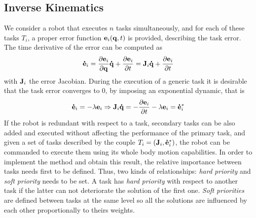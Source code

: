 \subsection{Inverse Kinematics}
We consider a robot that executes $n$ tasks simultaneously, and for each of these tasks $T_i$, a proper error function $\mathbf{e}_i(\mathbf{q},t)$ is provided, describing the task error.
The time derivative of the error can be computed as
\begin{equation}
\mathbf{\dot{e}}_i = \frac{\partial \mathbf{e}_i}{\partial \mathbf{q}}\mathbf{\dot{q}} + \frac{\partial \mathbf{e}_i}{\partial t} = \mathbf{J}_i\mathbf{\dot{q}} + \frac{\partial \mathbf{e}_i}{\partial t}
\end{equation} 
with $\mathbf{J}_i$ the error Jacobian. During the execution of a generic task it is desirable that the task error converges to 0, by imposing an exponential dynamic, that is
\begin{equation}
\mathbf{\dot{e}}_i= - \lambda \mathbf{e}_i \Rightarrow \mathbf{J}_i\mathbf{\dot{q}} = -\frac{\partial \mathbf{e}_i}{\partial t} - \lambda \mathbf{e}_i = \mathbf{\dot{e}}^*_i
\end{equation}
If the robot is redundant with respect to a task, secondary tasks can be also added and executed without affecting the performance of the primary task, and given a set of tasks described by the couple 
$T_i = (\mathbf{J}_i, \mathbf{\dot{e}}^*_i)$, the robot can be commanded to execute them using its whole body motion capabilities. In order to implement the method and obtain this result, the relative importance between tasks needs first to be defined. Thus, two kinds of relationships: \emph{hard priority} and \emph{soft priority} needs to be set. 
A task has \emph{hard priority} with respect to another task if the latter can not deteriorate the solution of the first one. \emph{Soft priorities} are defined between tasks at the same level so all the solutions are influenced by each other proportionally to theirs weights.


